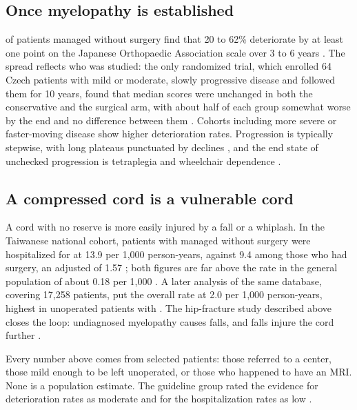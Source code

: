 \documentclass[11pt, letterpaper]{article}
\begin{document}
\subsection*{Once myelopathy is established}

 of patients managed without surgery find that 20 to 62\% deteriorate by at least one point on the Japanese Orthopaedic Association scale over 3 to 6 years \citep{fehlings2017cpg,karadimas2013}. The spread reflects who was studied: the only randomized trial, which enrolled 64 Czech patients with mild or moderate, slowly progressive disease and followed them for 10 years, found that median  scores were unchanged in both the conservative and the surgical arm, with about half of each group somewhat worse by the end and no difference between them \citep{kadanka2011}. Cohorts including more severe or faster-moving disease show higher deterioration rates. Progression is typically stepwise, with long plateaus punctuated by declines \citep{milligan2019}, and the end state of unchecked progression is \gls{tetraplegia} and wheelchair dependence \citep{davies2018}.

\subsection*{A compressed cord is a vulnerable cord}

A cord with no reserve is more easily injured by a fall or a whiplash. In the Taiwanese national cohort, patients with  managed without surgery were hospitalized for  at 13.9 per 1,000 person-years, against 9.4 among those who had surgery, an adjusted  of 1.57 \citep{wu2013}; both figures are far above the rate in the general population of about 0.18 per 1,000 \citep{fehlings2017cpg}. A later analysis of the same database, covering 17,258 patients, put the overall rate at 2.0 per 1,000 person-years, highest in unoperated patients with  \citep{chen2016}. The hip-fracture study described above closes the loop: undiagnosed myelopathy causes falls, and falls injure the cord further \citep{radcliff2016}.

\begin{note}
Every number above comes from selected patients: those referred to a center, those mild enough to be left unoperated, or those who happened to have an MRI. None is a population estimate. The guideline group rated the evidence for deterioration rates as moderate and for the hospitalization rates as low \citep{fehlings2017cpg}.
\end{note}
\end{document}
